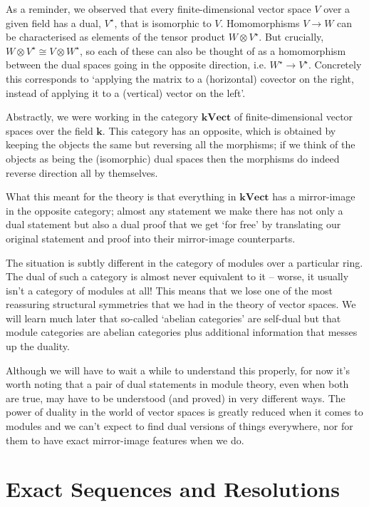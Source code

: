 \documentclass[oneside,english]{amsbook}
\numberwithin{section}{chapter}
\theoremstyle{plain}
\theoremstyle{definition}
\newcommand{\kVect}{\mathbf{k}\mathbf{Vect}}
\begin{document}
			As a reminder, we observed that every finite-dimensional vector space $V$ over a given field has a dual, $V^\star$, that is isomorphic to $V$. Homomorphisms $V\to W$ can be characterised as elements of the tensor product $W\otimes V^\star$. But crucially, $W\otimes V^\star\cong V\otimes W^\star$, so each of these can also be thought of as a homomorphism between the dual spaces going in the opposite direction, i.e. $W^\star\to V^\star$. Concretely this corresponds to `applying the matrix to a (horizontal) covector on the right, instead of applying it to a (vertical) vector on the left'.
			
			Abstractly, we were working in the category $\kVect$ of finite-dimensional vector spaces over the field $\mathbf{k}$. This category has an opposite, which is obtained by keeping the objects the same but reversing all the morphisms; if we think of the objects as being the (isomorphic) dual spaces then the morphisms do indeed reverse direction all by themselves.
			
			What this meant for the theory is that everything in $\kVect$ has a mirror-image in the opposite category; almost any statement we make there has not only a dual statement but also a dual proof that we get `for free' by translating our original statement and proof into their mirror-image counterparts.
			
			The situation is subtly different in the category of modules over a particular ring. The dual of such a category is almost never equivalent to it -- worse, it usually isn't a category of modules at all! This means that we lose one of the most reassuring structural symmetries that we had in the theory of vector spaces. We will learn much later that so-called `abelian categories' are self-dual but that module categories are abelian categories plus additional information that messes up the duality. 
			
			Although we will have to wait a while to understand this properly, for now it's worth noting that a pair of dual statements in module theory, even when both are true, may have to be understood (and proved) in very different ways. The power of duality in the world of vector spaces is greatly reduced when it comes to modules and we can't expect to find dual versions of things everywhere, nor for them to have exact mirror-image features when we do.

	\chapter{Exact Sequences and Resolutions}
\end{document}
